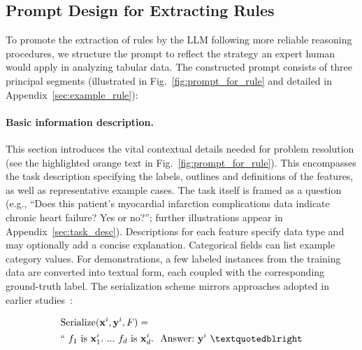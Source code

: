 \subsection{Prompt Design for Extracting Rules}
\label{Sec:prompt_design}
To promote the extraction of rules by the LLM following more reliable reasoning procedures, we structure the prompt to reflect the strategy an expert human would apply in analyzing tabular data. The constructed prompt consists of three principal segments (illustrated in Fig.~\ref{fig:prompt_for_rule} and detailed in Appendix~\ref{sec:example_rule}):

\vspace*{-0.12in}
\paragraph{Basic information description.} This section introduces the vital contextual details needed for problem resolution (see the highlighted orange text in Fig.~\ref{fig:prompt_for_rule}). This encompasses the task description specifying the labels, outlines and definitions of the features, as well as representative example cases. The task itself is framed as a question (e.g., “Does this patient’s myocardial infarction complications data indicate chronic heart failure? Yes or no?”; further illustrations appear in Appendix~\ref{sec:task_desc}). Descriptions for each feature specify data type and may optionally add a concise explanation. Categorical fields can list example category values. For demonstrations, a few labeled instances from the training data are converted into textual form, each coupled with the corresponding ground-truth label. The serialization scheme mirrors approaches adopted in earlier studies~\cite{dinh2022lift,hegselmann2023tabllm}:

\begin{align}
&\text{Serialize}(\mathbf{x}^i,\mathbf{y}^i, F) = \nonumber \\ 
&``\ f_1\ \text{is}\ \mathbf{x}^i_1.\ ... \ f_d\  \text{is}\  \mathbf{x}^i_d.\ \ \text{Answer:}\  \mathbf{y}^i\ ”
\end{align}

\vspace*{-0.12in}
